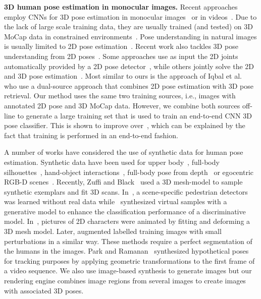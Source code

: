 \documentclass{article}
\begin{document}
{\bf 3D human pose estimation in monocular images.} 
Recent approaches employ CNNs for 3D pose estimation in monocular
images~\cite{LiZC15} or in videos~\cite{ZhouZLDD16}. Due to the
lack of large scale training data, they are usually trained  (and
tested) on 3D MoCap data in constrained
environments~\cite{LiZC15}. Pose understanding in natural images
is usually limited to 2D pose
estimation~\cite{ChenY14,TompsonJLB14,ToshevS14_DeepPose}. Recent work
also tackles 3D pose understanding from 2D
poses~\cite{AkhterB15,FanZZW14}. Some
approaches use as input the 2D joints automatically provided by a 2D
pose detector~\cite{Simo-SerraRATM12,WangWLYG14}, while others jointly
solve  the  2D and 3D pose estimation~\cite{Simo-SerraQTM13,ZhouT14}.
Most similar to ours is the approach of Iqbal et al.~\cite{IqbalGG16}
who use a dual-source approach that combines 2D pose estimation with
3D pose retrieval. Our method uses the same two training sources,
i.e., images with annotated 2D pose and 3D MoCap data. However, we
combine both sources off-line to generate a large training set that is
used to train an end-to-end CNN 3D pose classifier. This is shown to
improve over~\cite{IqbalGG16}, which can be explained by the fact that
training is performed in an end-to-end fashion. 






















 A number of works have considered the use of synthetic data for human pose estimation. Synthetic data have been used for upper body~\cite{ShakhnarovichVD03}, full-body silhouettes~\cite{DAgarwalT06}, hand-object interactions~\cite{romero_hands_2010}, full-body pose from depth~\cite{ShottonFCSFMKB11} or egocentric RGB-D scenes~\cite{RogezSR15}. Recently,  Zuffi and Black~\cite{ZuffiB15} used a 3D mesh-model to sample synthetic exemplars and fit 3D scans. In~\cite{HattoriBKK15}, a scene-specific pedestrian detectors was learned  without real data while~\cite{EnzweilerG08} synthesized  virtual samples with a generative model to enhance the classification performance of a discriminative model. In~\cite{HornungDK07},  pictures of 2D characters were animated by fitting and deforming a 3D mesh model. Later, \cite{PishchulinJATS12} augmented labelled training images with small perturbations in a similar way. These methods require a perfect segmentation of the humans in the images. Park and Ramanan~\cite{ParkR15}  synthesized hypothetical poses for tracking purposes by applying geometric transformations to the first frame of a video sequence. We also use  image-based synthesis to generate images but our rendering engine combines image regions from several images to create  images with associated 3D poses.  
\end{document}
